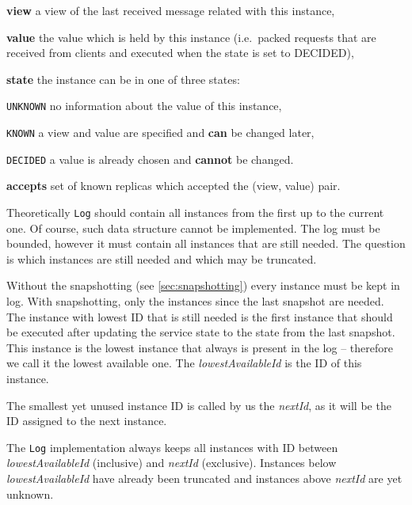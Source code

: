\begin{tightList}[\setlength{\itemindent}{0pt}\setlength{\leftmargin}{2\leftmargin}]
  \item[\textbf{view}] a view of the last received message related with this instance,
  \item[\textbf{value}] the value which is held by this instance (i.e.\ packed requests that are \linebreak received from clients and executed when the state is set to DECIDED), 
  \item[\textbf{state}] the instance can be in one of three states:
  \begin{tightList}[\setlength{\itemindent}{0pt} \setlength{\labelwidth}{7em}]
    \item[\texttt{\tiny UNKNOWN}] no information about the value of this instance,
    \item[\texttt{\tiny KNOWN}] a view and value are specified and \textbf{can} be changed later,
    \item[\texttt{\tiny DECIDED}] a value is already chosen and \textbf{cannot} be changed.
  \end{tightList}
  \item[\textbf{accepts}] set of known replicas which accepted the (view, value) pair.
\end{tightList}

Theoretically \texttt{Log} should contain all instances from the first up to the current one.
Of course, such data structure cannot be implemented. The log must be bounded, however it must contain all instances that are still needed. The question is which instances are still needed and which may be truncated.

Without the snapshotting (see \ref{sec:snapshotting}) every instance must be kept in log. With snapshotting, only the instances since the last snapshot are needed. The instance with lowest ID that is still needed is the first instance that should be executed after updating the service state to the state from the last snapshot. This instance is the lowest instance that always is present in the log -- therefore we call it the lowest available one. The \textit{lowestAvailableId} is the ID of this instance.

The smallest yet unused instance ID is called by us the \textit{nextId}, as it will be the ID assigned to the next instance.

The \texttt{Log} implementation always keeps all instances with ID between \textit{lowestAvailableId} (inclusive) and \textit{nextId} (exclusive). Instances below \textit{lowestAvailableId} have already been truncated and instances above \textit{nextId} are yet unknown.

